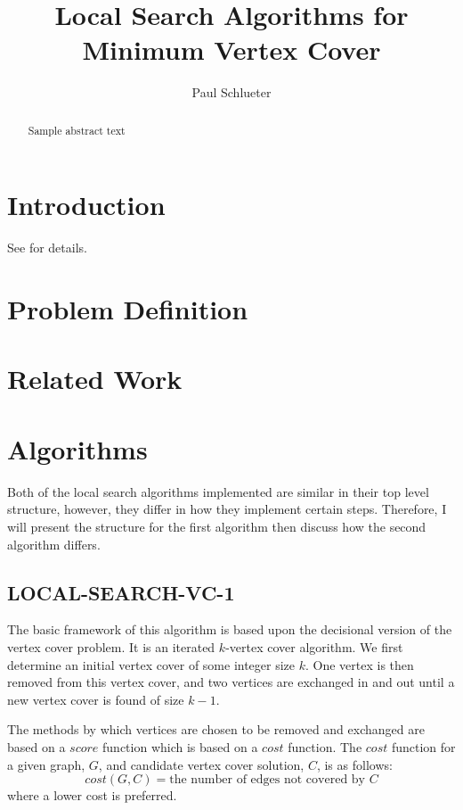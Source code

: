 \documentclass[sigconf]{acmart}
\begin{document}
\title{Local Search Algorithms for Minimum Vertex Cover}

\author{Paul Schlueter}

\begin{abstract}
Sample abstract text
\end{abstract}


\maketitle
 
\section{Introduction} \label{sec:intro}
See \cite{cai2013numvc} for details.

\section{Problem Definition}

\section{Related Work}

\section{Algorithms}
Both of the local search algorithms implemented are similar in their top level structure, however, they differ in how they implement certain steps. Therefore, I will present the structure for the first algorithm then discuss how the second algorithm differs.
\subsection{LOCAL-SEARCH-VC-1}
The basic framework of this algorithm is based upon the decisional version of the vertex cover problem. It is an iterated $k$-vertex cover algorithm. We first determine an initial vertex cover of some integer size $k$. One vertex is then removed from this vertex cover, and two vertices are exchanged in and out until a new vertex cover is found of size $k - 1$.

The methods by which vertices are chosen to be removed and exchanged are based on a $score$ function which is based on a $cost$ function. The $cost$ function for a given graph, $G$, and candidate vertex cover solution, $C$, is as follows:
\begin{equation*}
	cost(G,C) = \text{the number of edges not covered by $C$}
\end{equation*}
where a lower cost is preferred.
\end{document}
